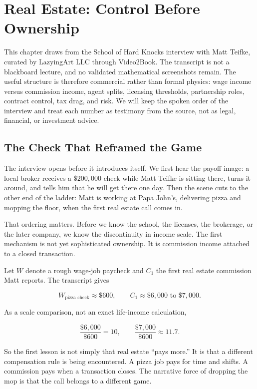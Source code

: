 \chapter{Real Estate: Control Before Ownership}

This chapter draws from the School of Hard Knocks interview with Matt Teifke, curated by LazyingArt LLC through Video2Book. The transcript is not a blackboard lecture, and no validated mathematical screenshots remain. The useful structure is therefore commercial rather than formal physics: wage income versus commission income, agent splits, licensing thresholds, partnership roles, contract control, tax drag, and risk. We will keep the spoken order of the interview and treat each number as testimony from the source, not as legal, financial, or investment advice.

\section{The Check That Reframed the Game}

The interview opens before it introduces itself. We first hear the payoff image: a local broker receives a \(\$200{,}000\) check while Matt Teifke is sitting there, turns it around, and tells him that he will get there one day. Then the scene cuts to the other end of the ladder: Matt is working at Papa John's, delivering pizza and mopping the floor, when the first real estate call comes in.

That ordering matters. Before we know the school, the licenses, the brokerage, or the later company, we know the discontinuity in income scale. The first mechanism is not yet sophisticated ownership. It is commission income attached to a closed transaction.

Let \(W\) denote a rough wage-job paycheck and \(C_1\) the first real estate commission Matt reports. The transcript gives

\begin{equation}
W_{\text{pizza check}} \approx \$600,
\qquad
C_1 \approx \$6{,}000 \text{ to } \$7{,}000 .
\end{equation}

As a scale comparison, not an exact life-income calculation,

\begin{equation}
\frac{\$6{,}000}{\$600}=10,
\qquad
\frac{\$7{,}000}{\$600}\approx 11.7 .
\end{equation}

So the first lesson is not simply that real estate ``pays more.'' It is that a different compensation rule is being encountered. A pizza job pays for time and shifts. A commission pays when a transaction closes. The narrative force of dropping the mop is that the call belongs to a different game.

